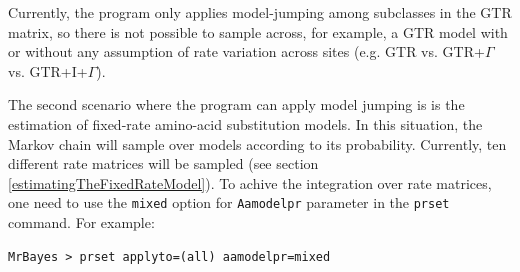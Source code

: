 \documentclass[12pt]{book}
\newcommand{\ttt}[1]{\texttt{#1}}
\begin{document}
Currently, the program only applies model-jumping among subclasses in the GTR matrix, so there
is not possible to sample across, for example, a GTR model with or without any assumption of rate
variation across sites (e.g. GTR vs. GTR+$\Gamma$ vs. GTR+I+$\Gamma$).

The second scenario where the program can apply model jumping is is the estimation of fixed-rate
amino-acid substitution models. In this situation, the Markov chain will sample over models
according to its probability. Currently, ten different rate matrices will be sampled (see section
\ref{estimatingTheFixedRateModel}). To achive the integration over rate matrices, one need to use
the \ttt{mixed} option for \ttt{Aamodelpr} parameter in the \ttt{prset} command. For example:

\footnotesize
\begin{singlespacing}
\begin{verbatim}
MrBayes > prset applyto=(all) aamodelpr=mixed
\end{verbatim}
\end{singlespacing}
\normalsize


% 
% 
% 
% 
\end{document}
